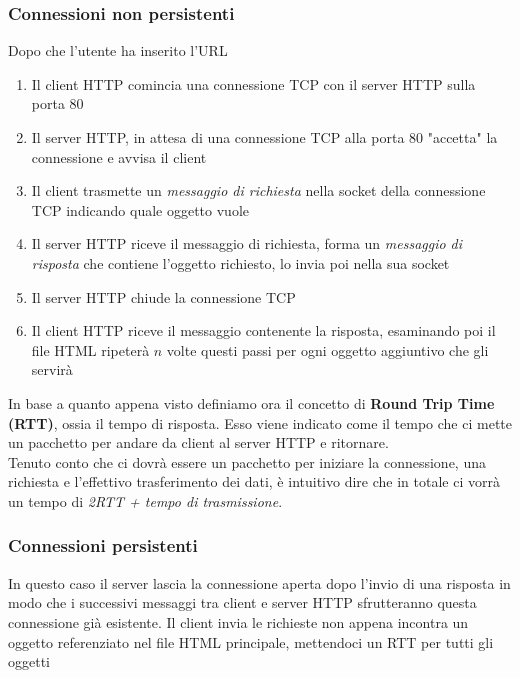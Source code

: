 \documentclass{article}
\begin{document}
            \subsubsection{Connessioni non persistenti}
                Dopo che l'utente ha inserito l'URL
                \begin{enumerate}
                    \item Il client HTTP comincia una connessione TCP con il server HTTP sulla porta 80
                    \item Il server HTTP, in attesa di una connessione TCP alla porta 80 "accetta" la connessione e avvisa il client
                    \item Il client trasmette un \textit{messaggio di richiesta} nella socket della connessione TCP indicando quale oggetto vuole
                    \item Il server HTTP riceve il messaggio di richiesta, forma un \textit{messaggio di risposta} che contiene l'oggetto richiesto, lo invia poi nella sua socket
                    \item Il server HTTP chiude la connessione TCP
                    \item Il client HTTP riceve il messaggio contenente la risposta, esaminando poi il file HTML ripeterà $ n $ volte questi passi per ogni oggetto aggiuntivo che gli servirà
                \end{enumerate}
                In base a quanto appena visto definiamo ora il concetto di \textbf{Round Trip Time (RTT)}, ossia il tempo di risposta. Esso viene indicato come il tempo che ci mette un pacchetto per andare da client al server HTTP e ritornare.\\
                Tenuto conto che ci dovrà essere un pacchetto per iniziare la connessione, una richiesta e l'effettivo trasferimento dei dati, è intuitivo dire che in totale ci vorrà un tempo di \textit{2RTT + tempo di trasmissione}.

            \subsubsection{Connessioni persistenti}
                In questo caso il server lascia la connessione aperta dopo l'invio di una risposta in modo che i successivi messaggi tra client e server HTTP sfrutteranno questa connessione già esistente. Il client invia le richieste non appena incontra un oggetto referenziato nel file HTML principale, mettendoci un RTT per tutti gli oggetti
\end{document}
